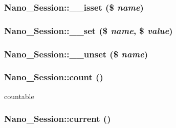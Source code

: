 \hypertarget{classNano__Session_a8cfa3bfb6a0885a184ca97a5d4786bf}{
\subsubsection[{\_\-\_\-isset}]{\setlength{\rightskip}{0pt plus 5cm}Nano\_\-Session::\_\-\_\-isset (\$ {\em name})}}
\label{classNano__Session_a8cfa3bfb6a0885a184ca97a5d4786bf}


\hypertarget{classNano__Session_90a7b2e05d567652db6bfec471f6a4bf}{
\subsubsection[{\_\-\_\-set}]{\setlength{\rightskip}{0pt plus 5cm}Nano\_\-Session::\_\-\_\-set (\$ {\em name}, \/  \$ {\em value})}}
\label{classNano__Session_90a7b2e05d567652db6bfec471f6a4bf}


\hypertarget{classNano__Session_cad4d5a9822e5ee2e0f36a1c2022b059}{
\subsubsection[{\_\-\_\-unset}]{\setlength{\rightskip}{0pt plus 5cm}Nano\_\-Session::\_\-\_\-unset (\$ {\em name})}}
\label{classNano__Session_cad4d5a9822e5ee2e0f36a1c2022b059}


\hypertarget{classNano__Session_64fb8369d4cc1018da3b073f7368503e}{
\subsubsection[{count}]{\setlength{\rightskip}{0pt plus 5cm}Nano\_\-Session::count ()}}
\label{classNano__Session_64fb8369d4cc1018da3b073f7368503e}


countable \hypertarget{classNano__Session_efbd95d2dadc4c2a0eb359b3a99aae3d}{
\subsubsection[{current}]{\setlength{\rightskip}{0pt plus 5cm}Nano\_\-Session::current ()}}
\label{classNano__Session_efbd95d2dadc4c2a0eb359b3a99aae3d}



